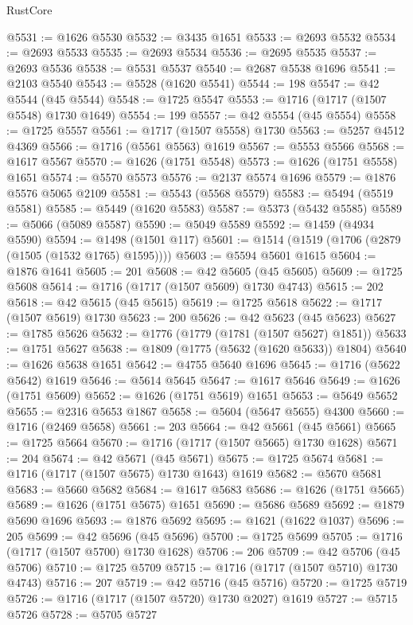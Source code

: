 \begin{lexlean}{RustCore}
\begin{coremodule}
@5531 := @1626 @5530
@5532 := @3435 @1651
@5533 := @2693 @5532
@5534 := @2693 @5533
@5535 := @2693 @5534
@5536 := @2695 @5535
@5537 := @2693 @5536
@5538 := @5531 @5537
@5540 := @2687 @5538 @1696
@5541 := @2103 @5540
@5543 := @5528 (@1620 @5541)
@5544 := 198
@5547 := @42 @5544 (@45 @5544)
@5548 := @1725 @5547
@5553 := @1716 (@1717 (@1507 @5548) @1730 @1649)
@5554 := 199
@5557 := @42 @5554 (@45 @5554)
@5558 := @1725 @5557
@5561 := @1717 (@1507 @5558) @1730
@5563 := @5257 @4512 @4369
@5566 := @1716 (@5561 @5563) @1619
@5567 := @5553 @5566
@5568 := @1617 @5567
@5570 := @1626 (@1751 @5548)
@5573 := @1626 (@1751 @5558) @1651
@5574 := @5570 @5573
@5576 := @2137 @5574 @1696
@5579 := @1876 @5576 @5065 @2109
@5581 := @5543 (@5568 @5579)
@5583 := @5494 (@5519 @5581)
@5585 := @5449 (@1620 @5583)
@5587 := @5373 (@5432 @5585)
@5589 := @5066 (@5089 @5587)
@5590 := @5049 @5589
@5592 := @1459 (@4934 @5590)
@5594 := @1498 (@1501 @117)
@5601 := @1514 (@1519 (@1706 (@2879 (@1505 (@1532 @1765) @1595))))
@5603 := @5594 @5601 @1615
@5604 := @1876 @1641
@5605 := 201
@5608 := @42 @5605 (@45 @5605)
@5609 := @1725 @5608
@5614 := @1716 (@1717 (@1507 @5609) @1730 @4743)
@5615 := 202
@5618 := @42 @5615 (@45 @5615)
@5619 := @1725 @5618
@5622 := @1717 (@1507 @5619) @1730
@5623 := 200
@5626 := @42 @5623 (@45 @5623)
@5627 := @1785 @5626
@5632 := @1776 (@1779 (@1781 (@1507 @5627) @1851))
@5633 := @1751 @5627
@5638 := @1809 (@1775 (@5632 (@1620 @5633)) @1804)
@5640 := @1626 @5638 @1651
@5642 := @4755 @5640 @1696
@5645 := @1716 (@5622 @5642) @1619
@5646 := @5614 @5645
@5647 := @1617 @5646
@5649 := @1626 (@1751 @5609)
@5652 := @1626 (@1751 @5619) @1651
@5653 := @5649 @5652
@5655 := @2316 @5653 @1867
@5658 := @5604 (@5647 @5655) @4300
@5660 := @1716 (@2469 @5658)
@5661 := 203
@5664 := @42 @5661 (@45 @5661)
@5665 := @1725 @5664
@5670 := @1716 (@1717 (@1507 @5665) @1730 @1628)
@5671 := 204
@5674 := @42 @5671 (@45 @5671)
@5675 := @1725 @5674
@5681 := @1716 (@1717 (@1507 @5675) @1730 @1643) @1619
@5682 := @5670 @5681
@5683 := @5660 @5682
@5684 := @1617 @5683
@5686 := @1626 (@1751 @5665)
@5689 := @1626 (@1751 @5675) @1651
@5690 := @5686 @5689
@5692 := @1879 @5690 @1696
@5693 := @1876 @5692
@5695 := @1621 (@1622 @1037)
@5696 := 205
@5699 := @42 @5696 (@45 @5696)
@5700 := @1725 @5699
@5705 := @1716 (@1717 (@1507 @5700) @1730 @1628)
@5706 := 206
@5709 := @42 @5706 (@45 @5706)
@5710 := @1725 @5709
@5715 := @1716 (@1717 (@1507 @5710) @1730 @4743)
@5716 := 207
@5719 := @42 @5716 (@45 @5716)
@5720 := @1725 @5719
@5726 := @1716 (@1717 (@1507 @5720) @1730 @2027) @1619
@5727 := @5715 @5726
@5728 := @5705 @5727

\end{coremodule}
\end{lexlean}
